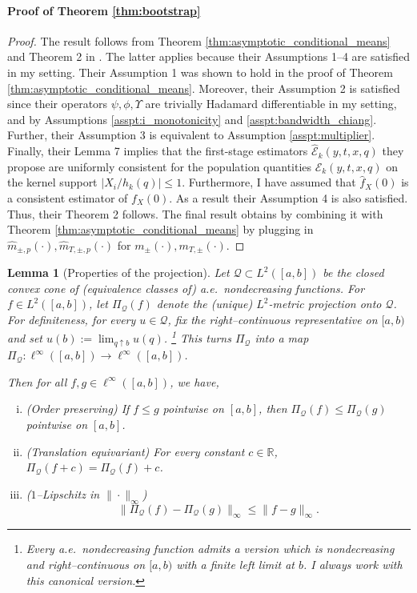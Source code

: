 \documentclass[12pt]{article}
\newtheorem{lemma}{Lemma}
\begin{document}
\paragraph{Proof of Theorem \ref{thm:bootstrap}}
\begin{proof}
The result follows from Theorem \ref{thm:asymptotic_conditional_means} and Theorem 2 in \citet{chiang2019robust}. The latter applies because their Assumptions 1--4 are satisfied in my setting. Their Assumption 1 was shown to hold in the proof of Theorem \ref{thm:asymptotic_conditional_means}. Moreover, their Assumption 2 is satisfied since their operators $\psi, \phi, \Upsilon$ are trivially Hadamard differentiable in my setting, and by Assumptions \ref{asspt:i_monotonicity} and \ref{asspt:bandwidth_chiang}. Further, their Assumption 3 is equivalent to Assumption \ref{asspt:multiplier}. Finally, their Lemma 7 implies that the first-stage estimators $\hat{\mathcal{E}}_{k}(y, t, x, q)$ they propose are uniformly consistent for the population quantities $\mathcal{E}_{k}(y, t, x, q)$ on the kernel support $|X_i / h_k(q)| \leq 1$. Furthermore, I have assumed that $\hat{f}_X(0)$ is a consistent estimator of $f_X(0)$. As a result their Assumption 4 is also satisfied. Thus, their Theorem 2 follows. The final result obtains by combining it with Theorem \ref{thm:asymptotic_conditional_means} by plugging in $\hat{m}_{\pm,p}(\cdot), \hat{m}_{T,\pm,p}(\cdot)$ for $m_\pm(\cdot), m_{T,\pm}(\cdot)$.
\end{proof}


\begin{lemma}[Properties of the projection] \label{lem:projection_properties}
Let $\mathcal Q\subset L^2([a,b])$ be the closed convex cone of (equivalence classes of) a.e.\ nondecreasing functions.
For $f\in L^2([a,b])$, let $\Pi_{\mathcal Q}(f)$ denote the (unique) $L^2$-metric projection onto $\mathcal Q$.
For definiteness, for every $u\in\mathcal Q$, fix the right–continuous representative on $[a,b)$ and set $u(b):=\lim_{q\uparrow b}u(q)$.%
\footnote{Every a.e.\ nondecreasing function admits a version which is nondecreasing and right–continuous on $[a,b)$ with a finite left limit at $b$. I always work with this canonical version.}
This turns $\Pi_{\mathcal Q}$ into a map $\Pi_{\mathcal Q}:\ell^\infty([a,b])\to\ell^\infty([a,b])$.

Then for all $f,g\in\ell^\infty([a,b])$, we have,
\begin{enumerate}[(i)]
\item (\emph{Order preserving}) If $f\le g$ pointwise on $[a,b]$, then $\Pi_{\mathcal Q}(f)\le \Pi_{\mathcal Q}(g)$ pointwise on $[a,b]$.
\item (\emph{Translation equivariant}) For every constant $c\in\mathbb R$, $\Pi_{\mathcal Q}(f+c)=\Pi_{\mathcal Q}(f)+c$.
\item (\emph{$1$–Lipschitz in $\|\cdot\|_\infty$}) 
\[
\|\Pi_{\mathcal Q}(f)-\Pi_{\mathcal Q}(g)\|_\infty\le \|f-g\|_\infty.
\]
\end{enumerate}
\end{lemma}
\end{document}
